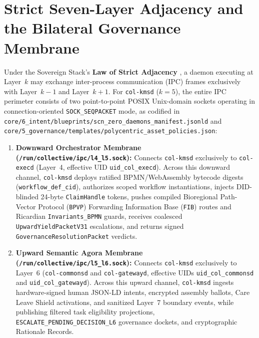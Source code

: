 \section{Strict Seven-Layer Adjacency and the Bilateral Governance Membrane}
\label{sec:ch1-bilateral-sockets}

Under the Sovereign Stack's \textbf{Law of Strict Adjacency} \parencite{saltzer1984end}, a
daemon executing at Layer~$k$ may exchange inter-process communication (IPC) frames exclusively
with Layer~$k-1$ and Layer~$k+1$. For \texttt{col-kmsd} ($k = 5$), the entire IPC perimeter
consists of two point-to-point POSIX Unix-domain sockets operating in connection-oriented
\texttt{SOCK\_SEQPACKET} mode, as codified in
\texttt{core/6\_intent/blueprints/scn\_zero\_daemons\_manifest.jsonld} and
\texttt{core/5\_governance/templates/polycentric\_asset\_policies.json}:

\begin{enumerate}
\item \textbf{Downward Orchestrator Membrane (\texttt{/run/collective/ipc/l4\_l5.sock}):}
        Connects \texttt{col-kmsd} exclusively to \texttt{col-execd} (Layer~4, effective UID
        \texttt{uid\_col\_execd}). Across this downward channel, \texttt{col-kmsd} deploys
        ratified BPMN/WebAssembly bytecode digests (\texttt{workflow\_def\_cid}), authorizes
        scoped workflow instantiations, injects DID-blinded 24-byte \texttt{ClaimHandle}
        tokens, pushes compiled Bioregional Path-Vector Protocol (\texttt{BPVP}) Forwarding
        Information Base (\texttt{FIB}) routes and Ricardian \texttt{Invariants\_BPMN} guards,
        receives coalesced \texttt{UpwardYieldPacketV31} escalations, and returns signed
        \texttt{GovernanceResolutionPacket} verdicts.
\item \textbf{Upward Semantic Agora Membrane (\texttt{/run/collective/ipc/l5\_l6.sock}):}
        Connects \texttt{col-kmsd} exclusively to Layer~6 (\texttt{col-commonsd} and
        \texttt{col-gatewayd}, effective UIDs \texttt{uid\_col\_commonsd} and
        \texttt{uid\_col\_gatewayd}). Across this upward channel, \texttt{col-kmsd} ingests
        hardware-signed human JSON-LD intents, encrypted assembly ballots, Care Leave Shield
        activations, and sanitized Layer~7 boundary events, while publishing filtered task
        eligibility projections, \texttt{ESCALATE\_PENDING\_DECISION\_L6} governance dockets,
        and cryptographic Rationale Records.
\end{enumerate}

